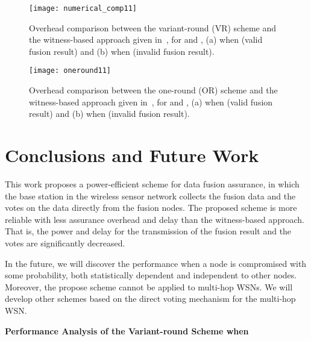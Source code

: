 \documentclass[12pt, onecolumn, draftcls]{IEEEtran}
\begin{document}
\begin{figure}
\centering
\texttt{[image: numerical\_comp11]}
\caption{Overhead comparison between the variant-round (VR) scheme
and the witness-based approach given in~\cite{du:assurance}, for
 and , (a) when  (valid fusion result)
and (b) when  (invalid fusion result).}
\label{fig:numerical_comp11}
\end{figure}

\begin{figure}
\centering
\texttt{[image: oneround11]}
\caption{Overhead comparison between the one-round (OR) scheme and
the witness-based approach given in~\cite{du:assurance}, for 
and , (a) when  (valid fusion result) and (b) when
 (invalid fusion result).} \label{fig:oneround11}
\end{figure}

\section{Conclusions and Future Work}
\label{sec:conclusions} This work proposes a power-efficient scheme
for data fusion assurance, in which the base station in the wireless
sensor network collects the fusion data and the votes on the data
directly from the fusion nodes. The proposed scheme is more reliable
with less assurance overhead and delay than the witness-based
approach. That is, the power and delay for the transmission of the
fusion result and the votes are significantly decreased.

In the future, we will discover the performance when a node is
compromised with some probability, both statistically dependent and
independent to other nodes. Moreover, the propose scheme cannot be
applied to multi-hop WSNs. We will develop other schemes based on
the direct voting mechanism for the multi-hop WSN.


\appendix

\begin{center}{\bf Performance Analysis of the Variant-round Scheme when
}\end{center}
\end{document}
